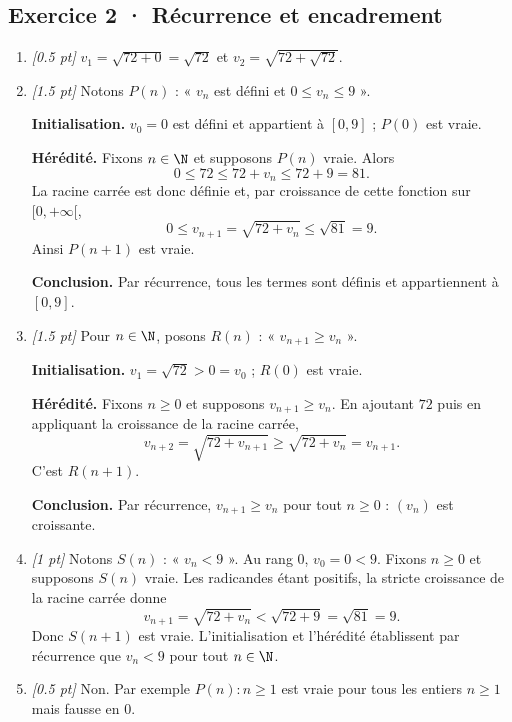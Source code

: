 \subsection*{Exercice 2 · Récurrence et encadrement}\begin{enumerate}

\item \textit{[\num{0,5} pt]} $v_1=\sqrt{72+0}=\sqrt{72}$ et $v_2=\sqrt{72+\sqrt{72}}$.

\item \textit{[\num{1,5} pt]} Notons $P(n)$ : « $v_n$ est défini et $0\le v_n\le 9$ ».
\par\smallskip\textbf{Initialisation.} $v_0=0$ est défini et appartient à $[0,9]$ ; $P(0)$ est vraie.
\par\smallskip\textbf{Hérédité.} Fixons $n\in\N$ et supposons $P(n)$ vraie. Alors
\[0\le 72\le 72+v_n\le 72+9=81.\]
La racine carrée est donc définie et, par croissance de cette fonction sur $[0,+\infty[$,
\[0\le v_{n+1}=\sqrt{72+v_n}\le\sqrt{81}=9.\]
Ainsi $P(n+1)$ est vraie.
\par\smallskip\textbf{Conclusion.} Par récurrence, tous les termes sont définis et appartiennent à $[0,9]$.

\item \textit{[\num{1,5} pt]} Pour $n\in\N$, posons $R(n)$ : « $v_{n+1}\ge v_n$ ».
\par\smallskip\textbf{Initialisation.} $v_1=\sqrt{72}>0=v_0$ ; $R(0)$ est vraie.
\par\smallskip\textbf{Hérédité.} Fixons $n\ge0$ et supposons $v_{n+1}\ge v_n$. En ajoutant $72$ puis en appliquant la croissance de la racine carrée,
\[v_{n+2}=\sqrt{72+v_{n+1}}\ge\sqrt{72+v_n}=v_{n+1}.\]
C'est $R(n+1)$.
\par\smallskip\textbf{Conclusion.} Par récurrence, $v_{n+1}\ge v_n$ pour tout $n\ge0$ : $(v_n)$ est croissante.

\item \textit{[1 pt]} Notons $S(n)$ : « $v_n<9$ ». Au rang $0$, $v_0=0<9$.
Fixons $n\ge0$ et supposons $S(n)$ vraie. Les radicandes étant positifs, la stricte croissance de la racine carrée donne
\[v_{n+1}=\sqrt{72+v_n}<\sqrt{72+9}=\sqrt{81}=9.\]
Donc $S(n+1)$ est vraie. L'initialisation et l'hérédité établissent par récurrence que $v_n<9$ pour tout $n\in\N$.

\item \textit{[\num{0,5} pt]} Non. Par exemple $P(n):n\ge1$ est vraie pour tous les entiers $n\ge1$ mais fausse en $0$.

\end{enumerate}

